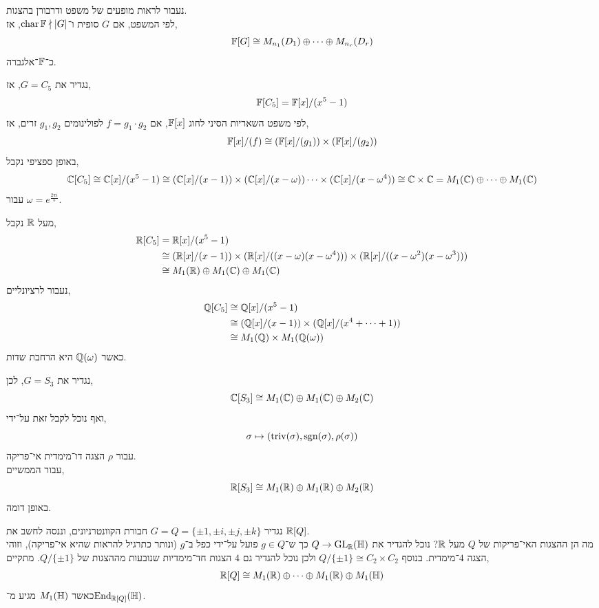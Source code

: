 נעבור לראות מופעים של משפט ודרבורן בהצגות. \\
לפי המשפט, אם $G$ סופית ו־$\operatorname{char} \mathbb{F} \nmid |G|$, אז,
\[
	\mathbb{F}[G]
	\cong M_{n_1}(D_1) \oplus \cdots \oplus M_{n_r}(D_r)
\]
כ־$\mathbb{F}$־אלגברה.
\begin{example}
	נגדיר את $G = C_5$, אז,
	\[
		\mathbb{F}[C_5]
		= \mathbb{F}[x] / (x^5 - 1)
	\]
	לפי משפט השאריות הסיני לחוג $\mathbb{F}[x]$, אם $f = g_1 \cdot g_2$ לפולינומים $g_1, g_2$ זרים, אז,
	\[
		\mathbb{F}[x] / (f)
		\cong (\mathbb{F}[x] / (g_1)) \times (\mathbb{F}[x] / (g_2))
	\]
	באופן ספציפי נקבל,
	\[
		\mathbb{C}[C_5]
		\cong \mathbb{C}[x] / (x^5 - 1)
		\cong (\mathbb{C}[x] / (x - 1)) \times (\mathbb{C}[x] / (x - \omega)) \cdots \times (\mathbb{C}[x] / (x - \omega^4))
		\cong \mathbb{C} \times \mathbb{C}
		= M_1(\mathbb{C}) \oplus \cdots \oplus M_1(\mathbb{C})
	\]
	עבור $\omega = e^{\frac{2 \pi i}{5}}$.

	מעל $\mathbb{R}$ נקבל,
	\begin{align*}
		\mathbb{R}[C_5]
		& = \mathbb{R}[x] / (x^5 - 1) \\
		& \cong (\mathbb{R}[x] / (x - 1)) \times (\mathbb{R}[x] / ((x - \omega)(x - \omega^4))) \times (\mathbb{R}[x] / ((x - \omega^2)(x - \omega^3))) \\
		& \cong M_1(\mathbb{R}) \oplus M_1(\mathbb{C}) \oplus M_1(\mathbb{C})
	\end{align*}
	נעבור לרציונליים,
	\begin{align*}
		\mathbb{Q}[C_5]
		& \cong \mathbb{Q}[x] / (x^5 - 1) \\
		& \cong (\mathbb{Q}[x] / (x - 1)) \times (\mathbb{Q}[x] / (x^4 + \cdots + 1)) \\
		& \cong M_1(\mathbb{Q}) \times M_1(\mathbb{Q}(\omega))
	\end{align*}
	כאשר $\mathbb{Q}(\omega)$ היא הרחבת שדות.
\end{example}
\begin{example}
	נגדיר את $G = S_3$, לכן,
	\[
		\mathbb{C}[S_3]
		\cong M_1(\mathbb{C}) \oplus M_1(\mathbb{C}) \oplus M_2(\mathbb{C})
	\]
	ואף נוכל לקבל זאת על־ידי,
	\[
		\sigma
		\mapsto (\operatorname{triv}(\sigma), \operatorname{sgn}(\sigma), \rho(\sigma))
	\]
	עבור $\rho$ הצגה דו־מימדית אי־פריקה. \\
	עבור הממשיים,
	\[
		\mathbb{R}[S_3]
		\cong M_1(\mathbb{R}) \oplus M_1(\mathbb{R}) \oplus M_2(\mathbb{R})
	\]
	באופן דומה.
\end{example}
\begin{example}
	נגדיר $G = Q = \{ \pm 1, \pm i, \pm j, \pm k \}$ חבורת הקוונטרניונים, וננסה לחשב את $\mathbb{R}[Q]$. \\
	מה הן ההצגות האי־פריקות של $Q$ מעל $\mathbb{R}$?
	נוכל להגדיר את $Q \to \operatorname{GL}_{\mathbb{R}}(\mathbb{H})$ כך ש־$g \in Q$ פועל על־ידי כפל ב־$g$ (ונותר כתרגיל להראות שהיא אי־פריקה), וזוהי הצגה $4$־מימדית.
	בנוסף $Q / \{ \pm 1 \} \cong C_2 \times C_2$ ולכן נוכל להגדיר גם $4$ הצגות חד־מימדיות שנובעות מההצגות של $Q / \{ \pm 1 \}$.
	מתקיים,
	\[
		\mathbb{R}[Q]
		\cong M_1(\mathbb{R}) \oplus \cdots \oplus M_1(\mathbb{R}) \oplus M_1(\mathbb{H})
	\]
	כאשר $M_1(\mathbb{H})$ מגיע מ־$\operatorname{End}_{\mathbb{R}[Q]}(\mathbb{H})$.
\end{example}

